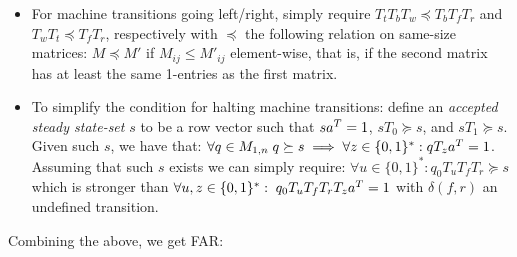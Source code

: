 \begin{itemize}

    \item For machine transitions going left/right, simply require $T_t T_b T_w\preceq T_b T_f T_r$ and $T_w T_t\preceq T_f T_r$, respectively with $\preceq$ the following relation on same-size matrices: $M\preceq M'$ if $M_{ij}\le M'_{ij}$ element-wise, that is, if the second matrix has at least the same 1-entries as the first matrix.

    \item To simplify the condition for halting machine transitions: define an \emph{accepted steady state-set} $s$ to be a row vector such that $sa^{T} = 1$, $s T_0\succeq s$, and $s T_1\succeq s$. Given such $s$, we have that: $\forall q\in M_{1,n}\; q \succeq s\implies \forall z\in\{0, 1\}^*: qT_{z}a^{T} = 1$. Assuming that such $s$ exists we can simply require: $\forall u\in\{0, 1\}^*: q_0T_u T_f T_r \succeq s$ which is stronger than $\forall u,z\in\{0, 1\}^*: \; q_0 T_u T_f T_r T_z a^{T} = 1$ with $\delta(f,r)$ an undefined transition.



\end{itemize}

Combining the above, we get FAR:



